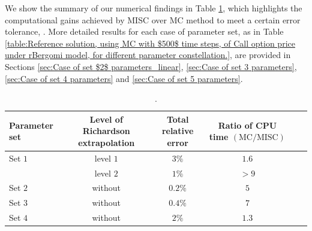 We show  the summary of our numerical findings in Table \ref{table:Summary of our numerical results.}, which  highlights the computational gains achieved by MISC over MC method to meet a certain error tolerance, . More detailed results for each case of parameter set, as in Table \ref{table:Reference solution, using MC with $500$ time steps, of Call option price under rBergomi model, for different parameter constellation.},  are provided in  Sections \ref{sec:Case of set $2$ parameters_linear}, \ref{sec:Case of set 3 parameters}, \ref{sec:Case of set 4 parameters} and \ref{sec:Case of set 5 parameters}. 
\FloatBarrier
\begin{table}[!h]
	\centering
	\begin{small}
	\begin{tabular}{l*{4}{c}r}
	\toprule[1.5pt]
		Parameter set           & Level of Richardson extrapolation    &  Total relative error  & Ratio of CPU time  $\left(\text{MC}/ \text{MISC} \right)$ \\
		\hline
			Set $1$ & level $1$ &  $3\%$&  $1.6$ \\	
              & level $2$ &  $1\%$ &  $>9$ \\	
              \hline
            Set $2$  & without    &  $0.2\%$&  $5$ \\		
				 \hline
					Set $3$  & without    &  $0.4\%$&  $7$ \\	
					\hline
						Set $4$ & without  &  $2\%$&  $1.3$ \\	
		\bottomrule[1.25pt]
	\end{tabular}
\end{small}
	\caption{.}
	\label{table:Summary of our numerical results.}
\end{table}
\FloatBarrier

	
	



